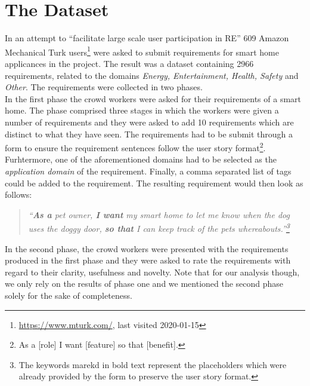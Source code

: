 \section{The \crowdre{} Dataset}
In an attempt to “facilitate large scale user participation in RE” \cite{murukannaiah_toward_2017} 609 Amazon Mechanical Turk users\footnote{\url{https://www.mturk.com/}, last visited 2020-01-15} were asked to submit requirements for smart home applicances in the \crowdre{} project. The result was a dataset containing 2966 requirements, related to the domains \emph{Energy, Entertainment, Health, Safety} and \emph{Other}.
The requirements were collected in two phases.\\In the first phase the crowd workers were asked for their requirements of a smart home. The phase comprised three stages in which the workers were given a number of requirements and they were asked to add 10 requirements which are distinct to what they have seen. The requirements had to be submit through a form to ensure the requirement sentences follow the user story format\footnote{As a [role] I want [feature] so that [benefit].}. Furhtermore, one of the aforementioned domains had to be selected as the \emph{application domain} of the requirement. Finally, a comma separated list of tags could be added to the requirement. The resulting requirement would then look as follows:

\begin{quote}
\textit{``\textbf{As a} pet owner, \textbf{I want} my smart home to let me know when the dog uses the doggy door, \textbf{so that} I can keep track of the pets whereabouts.''\footnote{The keywords marekd in bold text represent the placeholders which were already provided by the form to preserve the user story format.}}
\end{quote}


In the second phase, the crowd workers were presented with the requirements produced in the first phase and they were asked to rate the requirements with regard to their clarity, usefulness and novelty. Note that for our analysis though, we only rely on the results of phase one and we mentioned the second phase solely for the sake of completeness.

